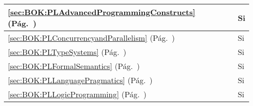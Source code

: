 \begin{center}
\begin{tabularx}{\textwidth}{|X|p{1cm}|p{1cm}|p{1.4cm}|}
\ref{sec:BOK:PLAdvancedProgrammingConstructs} \htmlref{\PLAdvancedProgrammingConstructs}{sec:BOK:PLAdvancedProgrammingConstructs}\xspace (Pág.~\pageref{sec:BOK:PLAdvancedProgrammingConstructs}) & ~ & ~ & Si \\ \hline
\ref{sec:BOK:PLConcurrencyandParallelism} \htmlref{\PLConcurrencyandParallelism}{sec:BOK:PLConcurrencyandParallelism}\xspace (Pág.~\pageref{sec:BOK:PLConcurrencyandParallelism}) & ~ & ~ & Si \\ \hline
\ref{sec:BOK:PLTypeSystems} \htmlref{\PLTypeSystems}{sec:BOK:PLTypeSystems}\xspace (Pág.~\pageref{sec:BOK:PLTypeSystems}) & ~ & ~ & Si \\ \hline
\ref{sec:BOK:PLFormalSemantics} \htmlref{\PLFormalSemantics}{sec:BOK:PLFormalSemantics}\xspace (Pág.~\pageref{sec:BOK:PLFormalSemantics}) & ~ & ~ & Si \\ \hline
\ref{sec:BOK:PLLanguagePragmatics} \htmlref{\PLLanguagePragmatics}{sec:BOK:PLLanguagePragmatics}\xspace (Pág.~\pageref{sec:BOK:PLLanguagePragmatics}) & ~ & ~ & Si \\ \hline
\ref{sec:BOK:PLLogicProgramming} \htmlref{\PLLogicProgramming}{sec:BOK:PLLogicProgramming}\xspace (Pág.~\pageref{sec:BOK:PLLogicProgramming}) & ~ & ~ & Si \\ \hline
\end{tabularx}
\end{center}
